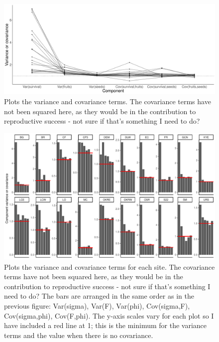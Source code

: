 \documentclass[12pt, oneside, titlepage]{article}   	%
\begin{document}

 \begin{figure}[h]
   \centering
       \includegraphics[page=1,width=1\textwidth]{../../figures/appendix/varianceDecomp/lineplot.pdf}  
    \caption{ Plots the variance and covariance terms. The covariance terms have not been squared here, as they would be in the contribution to reproductive success - not sure if that's something I need to do? }
 \label{fig:test}
\end{figure}


 \begin{figure}[h]
   \centering
       \includegraphics[page=1,width=1\textwidth]{../../figures/appendix/varianceDecomp/barPlots.pdf}  
    \caption{ Plots the variance and covariance terms for each site. The covariance terms have not been squared here, as they would be in the contribution to reproductive success - not sure if that's something I need to do? The bars are arranged in the same order as in the previous figure: Var(sigma), Var(F), Var(phi), Cov(sigma,F), Cov(sigma,phi), Cov(F,phi). The y-axis scales vary for each plot so I have included a red line at 1; this is the minimum for the variance terms and the value when there is no covariance.  }
 \label{fig:test}
\end{figure}

\newpage
\clearpage




\end{document}
